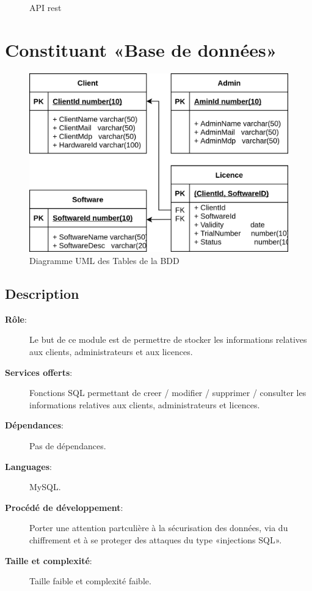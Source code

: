 \begin{figure}[hp!]
	\caption{API rest}
	
	\label{fig:fig2}
\end{figure}
\newpage

\section{Constituant «Base de données»}

\begin{figure}[h!]
	\centering
	\includegraphics[width=\textwidth - 2cm]{../png/SQL_table.png}
	\caption{Diagramme UML des Tables de la BDD}
	\label{fig:fig2}
\end{figure}

\subsection{Description}
\begin{description}
	\item[\textbf{Rôle}:]
		Le but de ce module est de permettre de stocker les informations relatives aux
		clients, administrateurs et aux licences. 
	\item[\textbf{Services offerts}:]
		Fonctions SQL permettant de creer / modifier / supprimer / consulter les 
	  informations relatives aux clients, administrateurs et licences.
	\item[\textbf{Dépendances}:]
		Pas de dépendances.		
	\item[\textbf{Languages}:]
		MySQL.
	\item[\textbf{Procédé de développement}:]
	  Porter une attention partculière à la sécurisation des données, via
	  du chiffrement et à se proteger des attaques du type «injections SQL». 
	\item[\textbf{Taille et complexité}:]
		Taille faible et complexité faible. 
\end{description}

